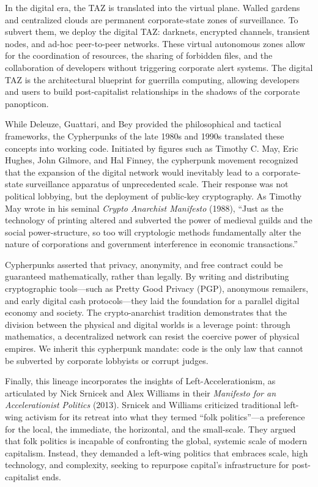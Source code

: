 In the digital era, the TAZ is translated into the virtual plane. Walled
gardens and centralized clouds are permanent corporate-state zones of
surveillance. To subvert them, we deploy the digital TAZ: darknets,
encrypted channels, transient nodes, and ad-hoc peer-to-peer networks.
These virtual autonomous zones allow for the coordination of resources,
the sharing of forbidden files, and the collaboration of developers
without triggering corporate alert systems. The digital TAZ is the
architectural blueprint for guerrilla computing, allowing developers and
users to build post-capitalist relationships in the shadows of the
corporate panopticon.

While Deleuze, Guattari, and Bey provided the philosophical and tactical
frameworks, the Cypherpunks of the late 1980s and 1990s translated these
concepts into working code. Initiated by figures such as Timothy C. May,
Eric Hughes, John Gilmore, and Hal Finney, the cypherpunk movement
recognized that the expansion of the digital network would inevitably
lead to a corporate-state surveillance apparatus of unprecedented scale.
Their response was not political lobbying, but the deployment of
public-key cryptography. As Timothy May wrote in his seminal
\emph{Crypto Anarchist Manifesto} (1988), ``Just as the technology of
printing altered and subverted the power of medieval guilds and the
social power-structure, so too will cryptologic methods fundamentally
alter the nature of corporations and government interference in economic
transactions.''

Cypherpunks asserted that privacy, anonymity, and free contract could be
guaranteed mathematically, rather than legally. By writing and
distributing cryptographic tools---such as Pretty Good Privacy (PGP),
anonymous remailers, and early digital cash protocols---they laid the
foundation for a parallel digital economy and society. The
crypto-anarchist tradition demonstrates that the division between the
physical and digital worlds is a leverage point: through mathematics, a
decentralized network can resist the coercive power of physical empires.
We inherit this cypherpunk mandate: code is the only law that cannot be
subverted by corporate lobbyists or corrupt judges.

Finally, this lineage incorporates the insights of Left-Accelerationism,
as articulated by Nick Srnicek and Alex Williams in their
\emph{Manifesto for an Accelerationist Politics} (2013). Srnicek and
Williams criticized traditional left-wing activism for its retreat into
what they termed ``folk politics''---a preference for the local, the
immediate, the horizontal, and the small-scale. They argued that folk
politics is incapable of confronting the global, systemic scale of
modern capitalism. Instead, they demanded a left-wing politics that
embraces scale, high technology, and complexity, seeking to repurpose
capital's infrastructure for post-capitalist ends.

